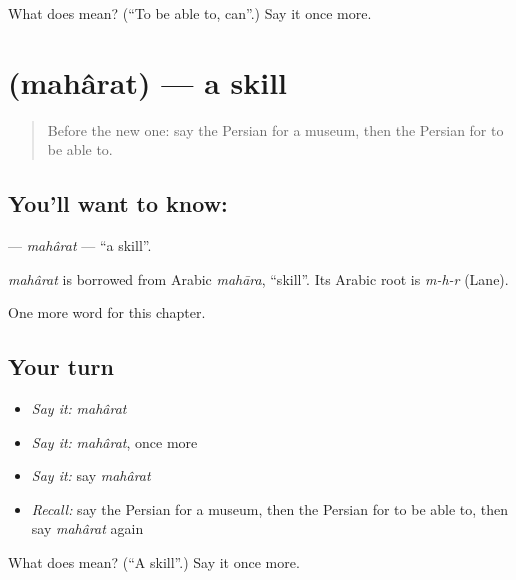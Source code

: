 \begin{tcolorbox}[breakable,colback=teal!4,colframe=teal!35!black,title={Before you move on}]
What does  mean? (\textquotedblleft{}To be able to, can\textquotedblright{}.) Say it once more.
\end{tcolorbox}
\section[\texorpdfstring{\fa{مهارت} (mahârat)}{مهارت (mahârat)}]{ (mahârat) — a skill}

\label{lesson:FA-C89-maharat}



\begin{quote}
Before the new one: say the Persian for a museum, then the Persian for to be able to.
\end{quote}

\subsection*{You'll want to know: }
\textbf{} — \emph{mahârat} — \textquotedblleft{}a skill\textquotedblright{}.

\begin{cousinweb}
\emph{mahârat} is borrowed from Arabic \emph{mahāra}, \textquotedblleft{}skill\textquotedblright{}. Its Arabic root is \emph{m-h-r} (Lane).
\end{cousinweb}

\begin{grammarlens}[title={What you've built}]
One more word for this chapter.
\end{grammarlens}

\subsection*{Your turn}
\begin{itemize}
\raggedright
  \item \emph{Say it:} \emph{mahârat}
  \item \emph{Say it:} \emph{mahârat}, once more
  \item \emph{Say it:} say \emph{mahârat}
  \item \emph{Recall:} say the Persian for a museum, then the Persian for to be able to, then say \emph{mahârat} again
\end{itemize}

\begin{tcolorbox}[breakable,colback=teal!4,colframe=teal!35!black,title={Before you move on}]
What does  mean? (\textquotedblleft{}A skill\textquotedblright{}.) Say it once more.
\end{tcolorbox}
